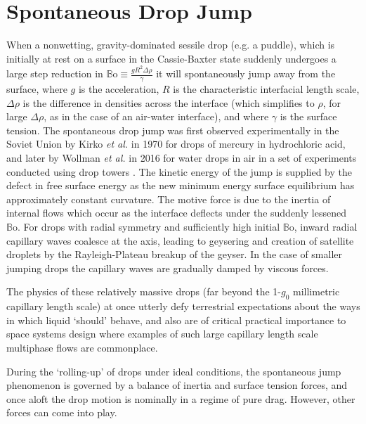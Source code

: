 \documentclass[aip,reprint, floatfix]{revtex4-1}
\begin{document}
\section{Spontaneous Drop Jump}
When a nonwetting, gravity-dominated sessile drop (e.g. a puddle), which is initially at rest on a surface in the Cassie-Baxter state suddenly undergoes a large step reduction in $\mathbb{B}\mbox{o} \equiv \frac{g R^2 \Delta \rho}{\gamma}$ it will spontaneously jump away from the surface, where $g$ is the acceleration, $R$ is the characteristic interfacial length scale, $\Delta \rho$ is the difference in densities across the interface (which simplifies to $\rho$, for large $\Delta \rho$, as in the case of an air-water interface), and where $\gamma$ is the surface tension. The spontaneous drop jump was first observed experimentally in the Soviet Union by Kirko \emph{et al.} \cite{kirko_phenomenon_1970} in 1970 for drops of mercury in hydrochloric acid, and later by Wollman \emph{et al.} in 2016 for water drops in air in a set of experiments conducted using drop towers \cite{wollman_more_2016}. The kinetic energy of the jump is supplied by the defect in free surface energy as the new minimum energy surface equilibrium has approximately constant curvature. The motive force is due to the inertia of internal flows which occur as the interface deflects under the suddenly lessened $\mathbb{B}\mbox{o}$. For drops with radial symmetry and sufficiently high initial $\mathbb{B}\mbox{o}$, inward radial capillary waves coalesce at the axis, leading to geysering and creation of satellite droplets by the Rayleigh-Plateau breakup of the geyser. In the case of smaller jumping drops the capillary waves are gradually damped by viscous forces.

The physics of these relatively massive drops (far beyond the 1-$g_0$ millimetric capillary length scale) at once utterly defy terrestrial expectations about the ways in which liquid `should' behave, and also are of critical practical importance to space systems design where examples of such large capillary length scale multiphase flows are commonplace.

During the `rolling-up' of drops under ideal conditions, the spontaneous jump phenomenon is governed by a balance of inertia and surface tension forces, and once aloft the drop motion is nominally in a regime of pure drag. However, other forces can come into play. 
\end{document}
